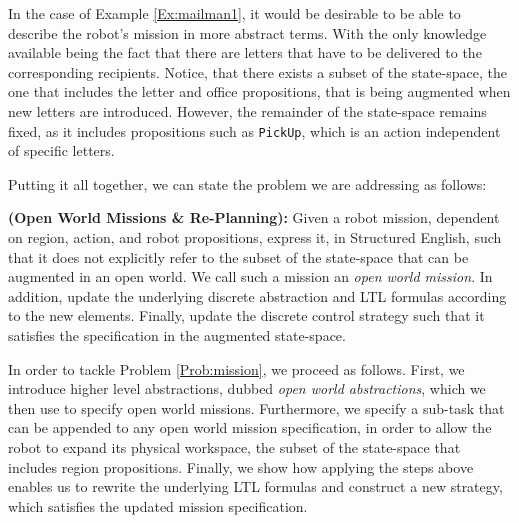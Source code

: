 In the case of Example \ref{Ex:mailman1}, it would be desirable to be able to describe the robot's mission in more abstract terms. With the only knowledge available being the fact that there are letters that have to be delivered to the corresponding recipients. Notice, that there exists a subset of the state-space, the one that includes the letter and office propositions, that is being augmented when new letters are introduced. However, the remainder of the state-space remains fixed, as it includes propositions such as \texttt{PickUp}, which is an action independent of specific letters. 

Putting it all together, we can state the problem we are addressing as follows:

\begin{myProblem}\label{Prob:mission}
	\textbf{(Open World Missions \& Re-Planning):} 
	Given a robot mission, dependent on region, action, and robot propositions, express it, in Structured English, such that it does not explicitly refer to the subset of the state-space that can be augmented in an open world. We call such a mission an \emph{open world mission}. In addition, update the underlying discrete abstraction and LTL formulas according to the new elements. Finally, update the discrete control strategy such that it satisfies the specification in the augmented state-space.
\end{myProblem}

In order to tackle Problem \ref{Prob:mission}, we proceed as follows. First, we introduce higher level abstractions, dubbed \emph{open world abstractions}, which we then use to specify open world missions. Furthermore, we specify a sub-task that can be appended to any open world mission specification, in order to allow the robot to expand its physical workspace, the subset of the state-space that includes region propositions. Finally, we  show how applying the steps above enables us to rewrite the underlying LTL formulas and construct a new strategy, which satisfies the updated mission specification.

